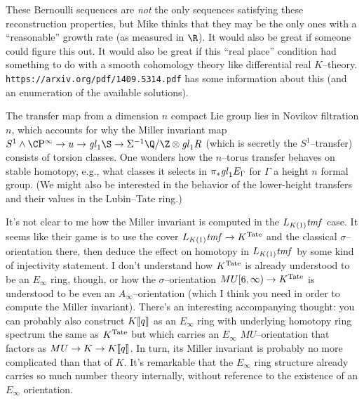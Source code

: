 These Bernoulli sequences are \emph{not} the only sequences satisfying these reconstruction properties, but Mike thinks that they may be the only ones with a ``reasonable'' growth rate (as measured in $\R$).  It would also be great if someone could figure this out.  It would also be great if this ``real place'' condition had something to do with a smooth cohomology theory like differential real $K$--theory.  \texttt{https://arxiv.org/pdf/1409.5314.pdf} has some information about this (and an enumeration of the available solutions).

The transfer map from a dimension $n$ compact Lie group lies in Novikov filtration $n$, which accounts for why the Miller invariant map $S^1 \sm \CP^\infty \to u \to \gl_1 \S \to \Susp^{-1} \Q/\Z \otimes \gl_1 R$ (which is secretly the $S^1$--transfer) consists of torsion classes.  One wonders how the $n$--torus transfer behaves on stable homotopy, e.g., what classes it selects in $\pi_* \mathit{gl}_1 E_\Gamma$ for $\Gamma$ a height $n$ formal group.  (We might also be interested in the behavior of the lower-height transfers and their values in the Lubin--Tate ring.)

It's not clear to me how the Miller invariant is computed in the $L_{K(1)} \mathit{tmf}$ case.  It seems like their game is to use the cover $L_{K(1)} \mathit{tmf} \to K^{\mathrm{Tate}}$ and the classical $\sigma$--orientation there, then deduce the effect on homotopy in $L_{K(1)} \mathit{tmf}$ by some kind of injectivity statement.  I don't understand how $K^{\mathrm{Tate}}$ is already understood to be an $E_\infty$ ring, though, or how the $\sigma$--orientation $MU[6, \infty) \to K^{\mathrm{Tate}}$ is understood to be even an $A_\infty$--orientation (which I think you need in order to compute the Miller invariant).  There's an interesting accompanying thought: you can probably also construct $K\llbracket{q}\rrbracket$ as an $E_\infty$ ring with underlying homotopy ring spectrum the same as $K^{\mathrm{Tate}}$ but which carries an $E_\infty$ $MU$--orientation that factors as $MU \to K \to K\llbracket{q}\rrbracket$.  In turn, its Miller invariant is probably no more complicated than that of $K$.  It's remarkable that the $E_\infty$ ring structure already carries so much number theory internally, without reference to the existence of an $E_\infty$ orientation.















